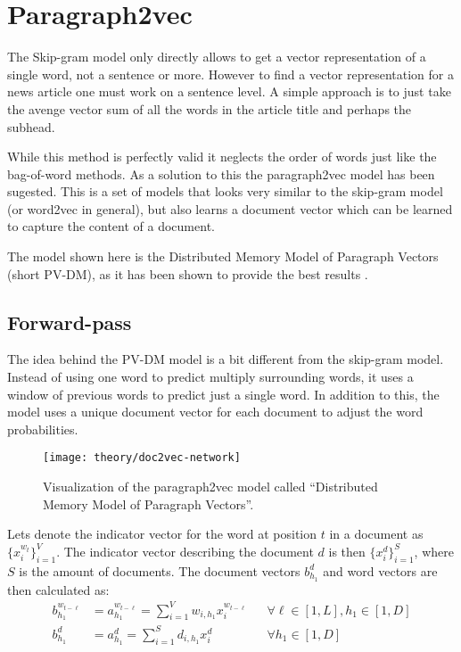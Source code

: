 
\section{Paragraph2vec}

The Skip-gram model only directly allows to get a vector representation of a single word, not a sentence or more. However to find a vector representation for a news article one must work on a sentence level. A simple approach is to just take the avenge vector sum of all the words in the article title and perhaps the subhead.

While this method is perfectly valid it neglects the order of words just like the bag-of-word methods. As a solution to this the paragraph2vec model has been sugested. This is a set of models that looks very similar to the skip-gram model (or word2vec in general), but also learns a document vector which can be learned to capture the content of a document.

The model shown here is the Distributed Memory Model of Paragraph Vectors (short PV-DM), as it has been shown to provide the best results \cite{doc2vec}. 

\subsection{Forward-pass}

The idea behind the PV-DM model is a bit different from the skip-gram model. Instead of using one word to predict multiply surrounding words, it uses a window of previous words to predict just a single word. In addition to this, the model uses a unique document vector for each document to adjust the word probabilities.

\begin{figure}[H]
	\centering
	\texttt{[image: theory/doc2vec-network]}
	\caption{Visualization of the paragraph2vec model called ``Distributed Memory Model of Paragraph Vectors''.}
	\label{fig:theory:doc2vec:network}
\end{figure}

Lets denote the indicator vector for the word at position $t$ in a document as $\{x_i^{w_t}\}_{i=1}^V$. The indicator vector describing the document $d$ is then $\{x_i^d\}_{i=1}^S$, where $S$ is the amount of documents. The document vectors $b_{h_1}^d$ and word vectors are then calculated as:
\begin{equation}
\begin{aligned}
b_{h_1}^{w_{t-\ell}} &= a_{h_1}^{w_{t-\ell}} = \sum_{i=1}^V w_{i,h_1} x_{i}^{w_{t-\ell}} && \forall \ell \in [1, L], h_1 \in [1, D] \\
b_{h_1}^d &= a_{h_1}^d = \sum_{i=1}^S d_{i,h_1} x_{i}^d && \forall h_1 \in [1, D]
\end{aligned}
\end{equation}

